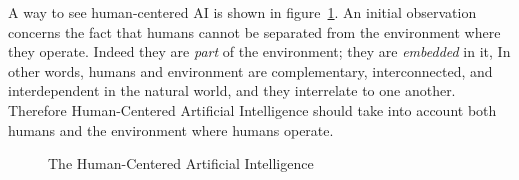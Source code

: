 

A way to see human-centered AI is shown in
figure~\ref{fig:hcai-onion}.  An initial observation concerns the fact
that humans cannot be separated from the environment where they
operate. Indeed they are \emph{part} of the environment; they are
\emph{embedded} in it, In other words, humans and environment are
complementary, interconnected, and interdependent in the natural
world, and they interrelate to one another. Therefore Human-Centered Artificial
Intelligence should take into account both humans and the
environment where humans operate.

\begin{figure}[h]
  \begin{center}
    
\end{center}
\caption{\label{fig:hcai-onion} The Human-Centered Artificial
  Intelligence }
\end{figure}

